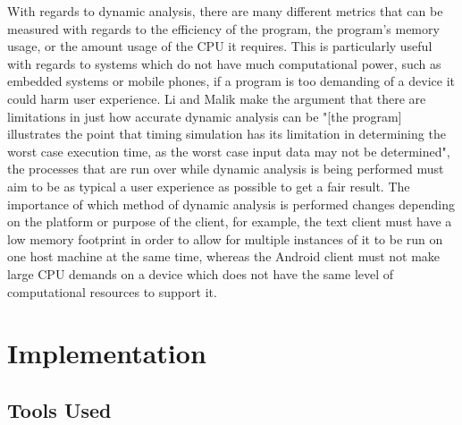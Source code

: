 \documentclass{article}
\begin{document}
	With regards to dynamic analysis, there are many different metrics that can be measured with regards to the efficiency of the program, the program's memory usage, or the amount usage of the CPU it requires. This is particularly useful with regards to systems which do not have much computational power, such as embedded systems or mobile phones, if a program is too demanding of a device it could harm user experience. Li and Malik\cite{664229} make the argument that there are limitations in just how accurate dynamic analysis can be "[the program] illustrates the point that timing simulation has its limitation in determining the worst case execution time, as the worst case input data may not be determined", the processes that are run over while dynamic analysis is being performed must aim to be as typical a user experience as possible to get a fair result. The importance of which method of dynamic analysis is performed changes depending on the platform or purpose of the client, for example, the text client must have a low memory footprint in order to allow for multiple instances of it to be run on one host machine at the same time, whereas the Android client must not make large CPU demands on a device which does not have the same level of computational resources to support it. 
\newpage
\section{Implementation}
\subsection{Tools Used}
\end{document}
